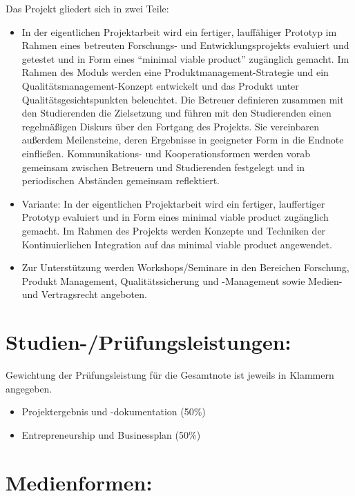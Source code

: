 Das Projekt gliedert sich in zwei Teile:

\begin{itemize}
\tightlist
\item
  In der eigentlichen Projektarbeit wird ein fertiger, lauffähiger
  Prototyp im Rahmen eines betreuten Forschungs- und
  Entwicklungsprojekts evaluiert und getestet und in Form eines
  ``minimal viable product'' zugänglich gemacht. Im Rahmen des Moduls
  werden eine Produktmanagement-Strategie und ein
  Qualitätsmanagement-Konzept entwickelt und das Produkt unter
  Qualitätsgesichtspunkten beleuchtet. Die Betreuer definieren zusammen
  mit den Studierenden die Zielsetzung und führen mit den Studierenden
  einen regelmäßigen Diskurs über den Fortgang des Projekts. Sie
  vereinbaren außerdem Meilensteine, deren Ergebnisse in geeigneter Form
  in die Endnote einfließen. Kommunikations- und Kooperationsformen
  werden vorab gemeinsam zwischen Betreuern und Studierenden festgelegt
  und in periodischen Abständen gemeinsam reflektiert.
\item
  Variante: In der eigentlichen Projektarbeit wird ein fertiger,
  lauffertiger Prototyp evaluiert und in Form eines minimal viable
  product zugänglich gemacht. Im Rahmen des Projekts werden Konzepte und
  Techniken der Kontinuierlichen Integration auf das minimal viable
  product angewendet.
\item
  Zur Unterstützung werden Workshops/Seminare in den Bereichen
  Forschung, Produkt Management, Qualitätssicherung und -Management
  sowie Medien- und Vertragsrecht angeboten.
\end{itemize}

\section*{Studien-/Prüfungsleistungen:}\label{studien-pruxfcfungsleistungen-9}

Gewichtung der Prüfungsleistung für die Gesamtnote ist jeweils in
Klammern angegeben.

\begin{itemize}
\tightlist
\item
  Projektergebnis und -dokumentation (50\%)
\item
  Entrepreneurship und Businessplan (50\%)
\end{itemize}

\section*{Medienformen:}\label{medienformen-9}

